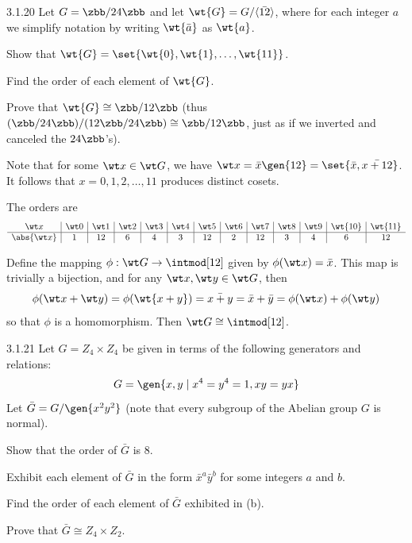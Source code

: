 \begin{spex}{3.1.20}
    Let $G = \zbb/24\zbb$ and let $\wt{G} = G/\langle \bar{12} \rangle$, where for each integer $a$ we simplify notation by writing $\wt{\bar a}$ as $\wt{a}$.
    \begin{subexercises}
        \item Show that $\wt{G} = \set{ \wt{0}, \wt{1}, \ldots, \wt{11} }$.
        \item Find the order of each element of $\wt{G}$.
        \item Prove that $\wt{G} \cong \zbb/12\zbb$ (thus $(\zbb/24\zbb)/(12\zbb/24\zbb) \cong \zbb/12\zbb$, just as if we inverted and canceled the $24\zbb$'s).
    \end{subexercises}
\end{spex}

\begin{solenum}[spsol]
    \item Note that for some $\wt x \in \wt G$, we have $\wt x = \bar x\gen{12} = \set{\bar x, \bar{x + 12}}$.
	It follows that $x = 0, 1, 2, \dots, 11$ produces distinct cosets.
    \item The orders are
    \[
        \begin{array}{c|c|c|c|c|c|c|c|c|c|c|c|c}
            \wt x & \wt 0 & \wt 1 & \wt 2 & \wt 3 & \wt 4 & \wt 5 & \wt 6 & \wt 7 & \wt 8 & \wt 9 & \wt{10} & \wt{11} \\
            \hline
            \abs{\wt x} & 1 & 12 & 6 & 4 & 3 & 12 & 2 & 12 & 3 & 4 & 6 & 12
        \end{array}
    \]
    \item Define the mapping $\phi : \wt G \to \intmod[12]$ given by $\phi(\wt x) = \bar x$.
	This map is trivially a bijection, and for any $\wt x, \wt y \in \wt G$, then
    \[
    	\phi(\wt x + \wt y) = \phi(\wt{x + y}) = \bar{x + y} = \bar x + \bar y = \phi(\wt x) + \phi(\wt y)
    \]
    so that $\phi$ is a homomorphism.
	Then $\wt G \cong \intmod[12]$.
\end{solenum}

\begin{exercise}{3.1.21}
    Let $G = Z_4 \times Z_4$ be given in terms of the following generators and relations:
    \[
    	G = \gen{x, y \mid x^4 = y^4 = 1, xy = yx}
    \]
    Let $\bar G = G/\gen{x^2y^2}$ (note that every subgroup of the Abelian group $G$ is normal).
    \begin{subexercises}
        \item Show that the order of $\bar G$ is 8.
        \item Exhibit each element of $\bar G$ in the form $\bar x^a \bar y^b$ for some integers $a$ and $b$.
        \item Find the order of each element of $\bar G$ exhibited in (b).
        \item Prove that $\bar G \cong Z_4 \times Z_2$.
    \end{subexercises}
\end{exercise}

